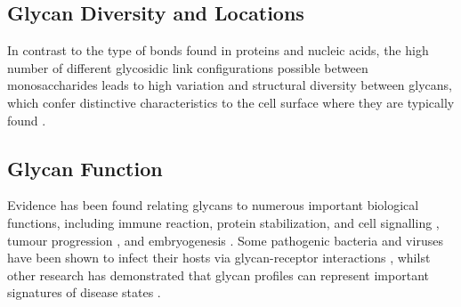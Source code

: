 \documentclass[12pt,a4paper]{article}
\begin{document}















\subsection{Glycan Diversity and Locations}
\label{sec:glycan_locations}
In contrast to the type of bonds found in proteins and nucleic acids, the high number of different glycosidic link configurations possible between monosaccharides leads to high variation and structural diversity between glycans, which confer distinctive characteristics to the cell surface where they are typically found \citep{10.1371/journal.pcbi.1002813}.\\











\subsection{Glycan Function}
\label{sec:glycan_function}
Evidence has been found relating glycans to numerous important biological functions, including immune reaction, protein stabilization, and cell signalling \citep{bucior2004carbohydrate}, tumour progression \citep{fuster2005sweet}, and embryogenesis \citep{rosa2002functional}. Some pathogenic bacteria and viruses have been shown to infect their hosts via glycan-receptor interactions \citep{cossart2004bacterial, sacks2001molecular}, whilst other research has demonstrated that glycan profiles can represent important signatures of disease states \citep{tong2003glycosylation}.
\end{document}
